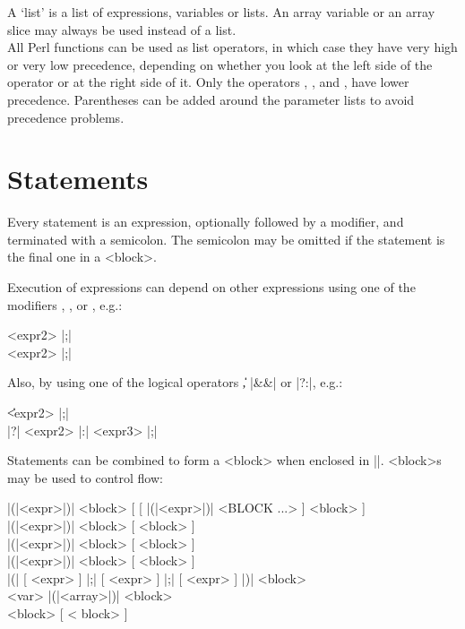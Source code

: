 \documentclass{refbase}
\begin{document}
A `list' is a list of expressions, variables
or lists. An array variable or an array slice may always be used
instead of a list.  
\\
All Perl functions can be used as list operators, in which case they have 
very high or very low precedence, depending on whether you look at the left
side of the operator or at the right side of it.
Only the operators , ,  and , 
have lower precedence.
\newline Parentheses can be added around the parameter lists 
to avoid precedence problems.


\section{Statements} 

Every statement is an expression, optionally followed by a modifier,
and terminated with a semicolon.  The semicolon may be omitted if the
statement is the final one in a <block>.

Execution of expressions can depend on other expressions using one of
the modifiers , ,  or ,
e.g.:

  <expr2> |;| \\
\quad	<expr1>  <expr2> |;|

Also, by using one of the logical operators \|\|, |&&| or |?:|, e.g.:

 \|\| <expr2> |;| \\
\quad	<expr1> |?| <expr2> |:| <expr3> |;| 

Statements can be combined to form a <block> when enclosed in |{}|.
<block>s may be used to control flow:

\quad	{} |(|<expr>|)| <block> [ [ 
	|(|<expr>|)| <BLOCK ...> ] 
	<block> ]
\\
\quad	{} |(|<expr>|)| <block> [ 
	<block> ]
\\
  |(|<expr>|)|
	<block> [  <block> ]
\\
  |(|<expr>|)|
	<block> [  <block> ]
\\
  |(| [ <expr> ] |;|
	[ <expr> ] |;| [ <expr> ] |)| <block>
\\
  <var>\dag
	|(|<array>|)| <block>
\\
 <block> [  < block> ]
\end{document}
